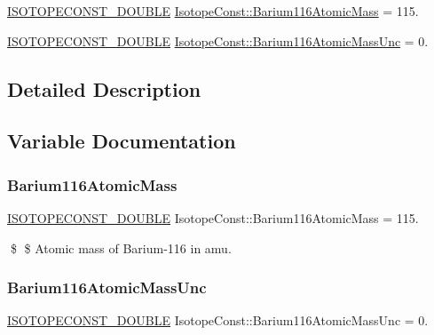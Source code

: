 \begin{DoxyCompactItemize}
\item 
\mbox{\hyperlink{group___isotope_const-_macros_ga8f45a7272ce02c0b4c65c44636ed719a}{I\+S\+O\+T\+O\+P\+E\+C\+O\+N\+S\+T\+\_\+\+D\+O\+U\+B\+LE}} \mbox{\hyperlink{group___isotope_const-_barium-_ba116_gae5ca3de75190ba9b40c08e540dd8fb0f}{Isotope\+Const\+::\+Barium116\+Atomic\+Mass}} = 115.
\item 
\mbox{\hyperlink{group___isotope_const-_macros_ga8f45a7272ce02c0b4c65c44636ed719a}{I\+S\+O\+T\+O\+P\+E\+C\+O\+N\+S\+T\+\_\+\+D\+O\+U\+B\+LE}} \mbox{\hyperlink{group___isotope_const-_barium-_ba116_ga05a19a9aaeff0c041a628cbff1476eaa}{Isotope\+Const\+::\+Barium116\+Atomic\+Mass\+Unc}} = 0.
\end{DoxyCompactItemize}


\subsection{Detailed Description}


\subsection{Variable Documentation}
\mbox{\label{group___isotope_const-_barium-_ba116_gae5ca3de75190ba9b40c08e540dd8fb0f}} 
\subsubsection{\texorpdfstring{Barium116\+Atomic\+Mass}{Barium116AtomicMass}}
{\footnotesize\ttfamily \mbox{\hyperlink{group___isotope_const-_macros_ga8f45a7272ce02c0b4c65c44636ed719a}{I\+S\+O\+T\+O\+P\+E\+C\+O\+N\+S\+T\+\_\+\+D\+O\+U\+B\+LE}} Isotope\+Const\+::\+Barium116\+Atomic\+Mass = 115.}

\$ \$ Atomic mass of Barium-\/116 in amu. \mbox{\label{group___isotope_const-_barium-_ba116_ga05a19a9aaeff0c041a628cbff1476eaa}} 
\subsubsection{\texorpdfstring{Barium116\+Atomic\+Mass\+Unc}{Barium116AtomicMassUnc}}
{\footnotesize\ttfamily \mbox{\hyperlink{group___isotope_const-_macros_ga8f45a7272ce02c0b4c65c44636ed719a}{I\+S\+O\+T\+O\+P\+E\+C\+O\+N\+S\+T\+\_\+\+D\+O\+U\+B\+LE}} Isotope\+Const\+::\+Barium116\+Atomic\+Mass\+Unc = 0.}

